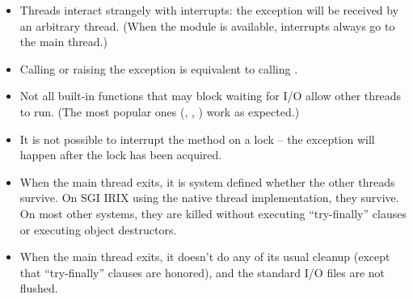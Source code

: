 \begin{itemize}
\item
Threads interact strangely with interrupts: the
 exception will be received by an arbitrary
thread.  (When the  module is available, interrupts
always go to the main thread.)

\item
Calling  or raising the  exception is
equivalent to calling .

\item
Not all built-in functions that may block waiting for I/O allow other
threads to run.  (The most popular ones (, ,
) work as expected.)

\item
It is not possible to interrupt the  method on a lock
-- the  exception will happen after the lock
has been acquired.

\item
When the main thread exits, it is system defined whether the other
threads survive.  On SGI IRIX using the native thread implementation,
they survive.  On most other systems, they are killed without
executing ``try-finally'' clauses or executing object destructors.

\item
When the main thread exits, it doesn't do any of its usual cleanup
(except that ``try-finally'' clauses are honored), and the standard
I/O files are not flushed.

\end{itemize}
